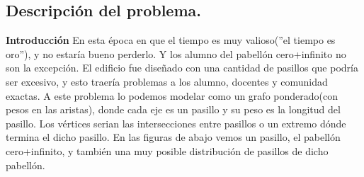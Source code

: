 \subsection{Descripción del problema.}

\vspace*{0.3cm}

\textbf{Introducción} \newline
En esta época en que el tiempo es muy valioso(''el tiempo es oro''), y no estaría bueno perderlo. Y los alumno del pabellón  cero+infinito no son la excepción. \newline
El edificio fue diseñado con una cantidad de pasillos que podría ser excesivo, y esto traería problemas a los alumno, docentes y comunidad exactas. \newline
 A este problema lo podemos modelar como un grafo ponderado(con pesos en las aristas), donde cada eje es un pasillo y su peso es la longitud del pasillo. Los vértices serian las intersecciones entre pasillos o un extremo dónde termina el dicho pasillo.
En las figuras de abajo vemos un pasillo, el pabellón cero+infinito, y también una muy posible distribución de pasillos de dicho pabellón.  
